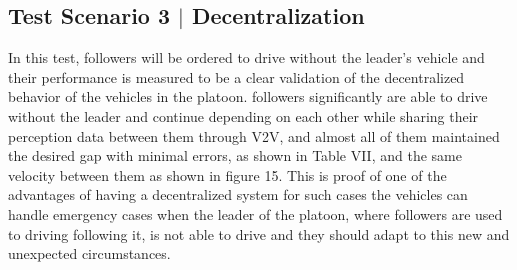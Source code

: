 \subsection{Test Scenario 3 $|$ Decentralization}%
In this test, followers will be ordered to drive without the leader's vehicle and their performance is measured to be a clear validation of the decentralized behavior of the vehicles in the platoon. followers significantly are able to drive without the leader and continue depending on each other while sharing their perception data between them through V2V, and almost all of them maintained the desired gap with minimal errors, as shown in Table VII, and the same velocity between them as shown in figure 15. This is proof of one of the advantages of having a decentralized system for such cases the vehicles can handle emergency cases when the leader of the platoon, where followers are used to driving following it, is not able to drive and they should adapt to this new and unexpected circumstances.



\begin{table}
\centering
\caption{Performance metrics of the test scenario 3} 
\end{table}




